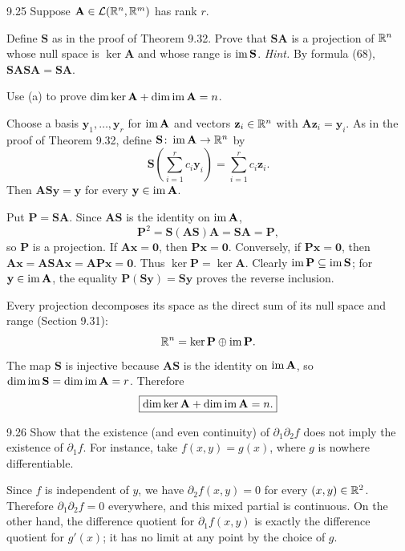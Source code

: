 \documentclass[11pt,oneside]{article}
\begin{document}
\begin{exercise}{9.25}
Suppose $\mathbf A\in\mathcal L(\mathbb{R}^n,\mathbb{R}^m)$ has rank $r$.
\begin{exercisesubparts}
\item Define $\mathbf S$ as in the proof of Theorem 9.32. Prove that $\mathbf S\mathbf A$ is a projection of $\mathbb{R}^n$ whose null space is $\ker\mathbf A$ and whose range is $\operatorname{im}\mathbf S$. 
\textit{Hint.} By formula (68), $\mathbf S\mathbf A\mathbf S\mathbf A=\mathbf S\mathbf A$.
\item Use (a) to prove $\dim\ker\mathbf A+\dim\operatorname{im}\mathbf A=n$.
\end{exercisesubparts}
\end{exercise}
\begin{solution}
Choose a basis $\mathbf y_1,\ldots,\mathbf y_r$ for $\operatorname{im}\mathbf A$ and vectors $\mathbf z_i\in\mathbb{R}^n$ with $\mathbf A\mathbf z_i=\mathbf y_i$. As in the proof of Theorem 9.32, define $\mathbf S\colon\operatorname{im}\mathbf A\to\mathbb{R}^n$ by
\[
 \mathbf S\left(\sum_{i=1}^r c_i\mathbf y_i\right)=\sum_{i=1}^r c_i\mathbf z_i.
\]
Then $\mathbf A\mathbf S\mathbf y=\mathbf y$ for every $\mathbf y\in\operatorname{im}\mathbf A$.
\begin{exercisesubparts}
\item Put $\mathbf P=\mathbf S\mathbf A$. Since $\mathbf A\mathbf S$ is the identity on $\operatorname{im}\mathbf A$,
\[
 \mathbf P^2=\mathbf S(\mathbf A\mathbf S)\mathbf A=\mathbf S\mathbf A=\mathbf P,
\]
so $\mathbf P$ is a projection. If $\mathbf A\mathbf x=\mathbf0$, then $\mathbf P\mathbf x=\mathbf0$. Conversely, if $\mathbf P\mathbf x=\mathbf0$, then
$\mathbf A\mathbf x=\mathbf A\mathbf S\mathbf A\mathbf x=\mathbf A\mathbf P\mathbf x=\mathbf0$.
Thus $\ker\mathbf P=\ker\mathbf A$. Clearly $\operatorname{im}\mathbf P\subseteq\operatorname{im}\mathbf S$; for $\mathbf y\in\operatorname{im}\mathbf A$, the equality $\mathbf P(\mathbf S\mathbf y)=\mathbf S\mathbf y$ proves the reverse inclusion.
\item Every projection decomposes its space as the direct sum of its null space and range (Section 9.31):
\[
 \mathbb{R}^n=\ker\mathbf P\oplus\operatorname{im}\mathbf P.
\]
The map $\mathbf S$ is injective because $\mathbf A\mathbf S$ is the identity on $\operatorname{im}\mathbf A$, so $\dim\operatorname{im}\mathbf S=\dim\operatorname{im}\mathbf A=r$. Therefore
\[
 \boxed{\dim\ker\mathbf A+\dim\operatorname{im}\mathbf A=n.}
\]
\end{exercisesubparts}
\end{solution}

\begin{exercise}{9.26}
Show that the existence (and even continuity) of $\partial_1\partial_2f$ does not imply the existence of $\partial_1f$. For instance, take $f(x,y)=g(x)$, where $g$ is nowhere differentiable.
\end{exercise}
\begin{solution}
Since $f$ is independent of $y$, we have $\partial_2f(x,y)=0$ for every $(x,y)\in\mathbb{R}^2$. Therefore $\partial_1\partial_2f=0$ everywhere, and this mixed partial is continuous. On the other hand, the difference quotient for $\partial_1f(x,y)$ is exactly the difference quotient for $g'(x)$; it has no limit at any point by the choice of $g$.
\end{solution}
\end{document}
